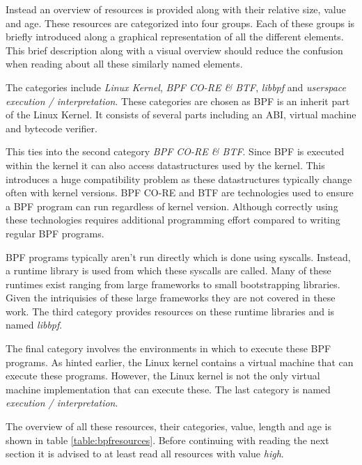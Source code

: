 \documentclass[conference]{IEEEtran}
\begin{document}
Instead an overview of resources is provided along with their relative size,
value and age. These resources are categorized into four groups. Each of these
groups is briefly introduced along a graphical representation of all the
different elements. This brief description along with a visual overview should
reduce the confusion when reading about all these similarly named elements.

The categories include \textit{Linux Kernel}, \textit{BPF CO-RE \& BTF},
\textit{libbpf} and \textit{userspace execution / interpretation}. These
categories are chosen as BPF is an inherit part of the Linux Kernel. It consists
of several parts including an ABI, virtual machine and bytecode verifier.

This ties into the second category \textit{BPF CO-RE \& BTF}. Since BPF is
executed within the kernel it can also access datastructures used by the kernel.
This introduces a huge compatibility problem as these datastructures typically
change often with kernel versions. BPF CO-RE and BTF are technologies used to
ensure a BPF program can run regardless of kernel version. Although correctly
using these technologies requires additional programming effort compared to
writing regular BPF programs.

BPF programs typically aren't run directly which is done using syscalls.
Instead, a runtime library is used from which these syscalls are called.
Many of these runtimes exist ranging from large frameworks to small
bootstrapping libraries. Given the intriquisies of these large frameworks they
are not covered in these work. The third category provides resources on these
runtime libraries and is named \textit{libbpf}.

The final category involves the environments in which to execute these BPF
programs. As hinted earlier, the Linux kernel contains a virtual machine that
can execute these programs. However, the Linux kernel is not the only virtual
machine implementation that can execute these. The last category is named
\textit{execution / interpretation}.

The overview of all these resources, their categories, value, length and age
is shown in table \ref{table:bpfresources}. Before continuing with reading the
next section it is advised to at least read all resources with value
\textit{high}.
\end{document}
